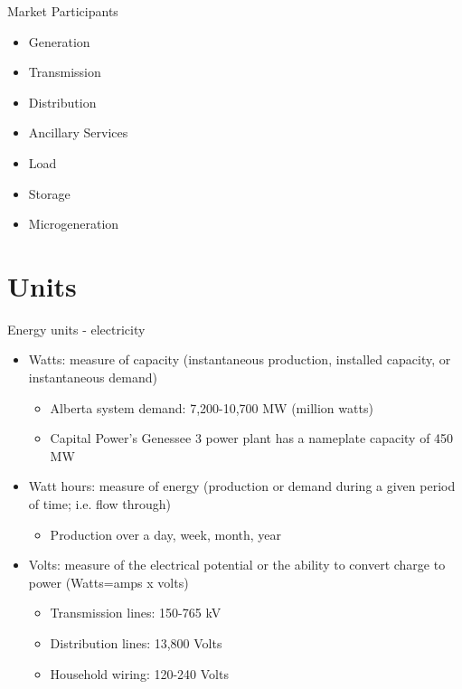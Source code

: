 \documentclass{beamer}
\renewcommand{\(}{\begin{columns}}
\renewcommand{\)}{\end{columns}}
\newcommand{\<}[1]{\begin{column}{#1}}
\renewcommand{\>}{\end{column}}
\begin{document}
\begin{frame}{Market Participants}
\begin{itemize}
\setlength\itemsep{1.7em}
\item Generation

\item Transmission

\item Distribution

\item Ancillary Services

\item Load

\item Storage

\item Microgeneration
\end{itemize}

\vfill \end{frame}



\section{Units}

\begin{frame}{Energy units - electricity}
\begin{itemize}
\setlength\itemsep{.75em}
\item Watts: measure of capacity (instantaneous production, installed capacity, or instantaneous demand)
\begin{itemize}
\setlength\itemsep{.5em}
\item Alberta system demand: 7,200-10,700 MW (million watts)
\item Capital Power's Genessee 3 power plant has a nameplate capacity of 450 MW
\end{itemize}
\item Watt hours: measure of energy (production or demand during a given period of time; i.e. flow through)
\begin{itemize}
\setlength\itemsep{.5em}
\item Production over a day, week, month, year
\end{itemize}
\item Volts: measure of the electrical potential or the ability to convert charge to power (Watts=amps x volts)
\begin{itemize}
\setlength\itemsep{.5em}
\item Transmission lines: 150-765 kV
\item Distribution lines: 13,800 Volts
\item Household wiring: 120-240 Volts
\end{itemize}
\end{itemize}
\vfill \end{frame}
\end{document}
